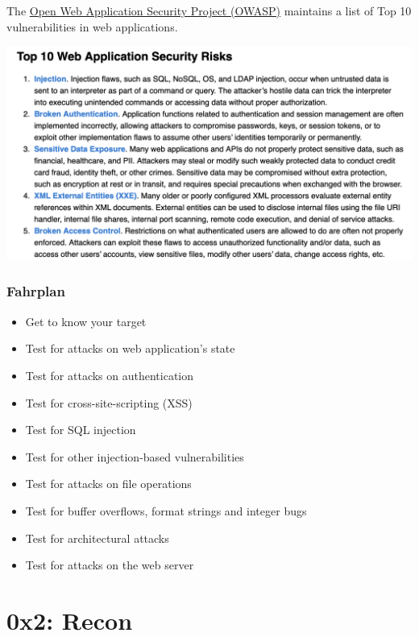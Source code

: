 \documentclass[aspectratio=169]{beamer}
\begin{document}
\begin{frame}

    The \href{https://owasp.org/www-project-top-ten/}{Open Web Application Security Project (OWASP)} maintains a list of Top 10 vulnerabilities in web applications.

    \begin{center}
        \includegraphics[scale=.35,angle=2]{img/owasp-top10.png}    
    \end{center}
\end{frame}

\begin{frame}
    \frametitle{Fahrplan}

    \begin{itemize}
        \item Get to know your target
        \item Test for attacks on web application's state
        \item Test for attacks on authentication
        \item Test for cross-site-scripting (XSS)
        \item Test for SQL injection
        \item Test for other injection-based vulnerabilities
        \item Test for attacks on file operations
        \item Test for buffer overflows, format strings and integer bugs
        \item Test for architectural attacks
        \item Test for attacks on the web server 
    \end{itemize}

\end{frame}

\section{0x2: Recon}
\end{document}
